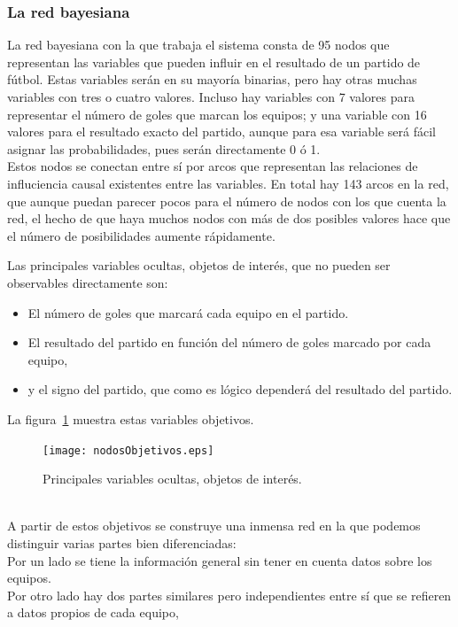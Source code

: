 \documentclass[a4paper,12pt]{article}
\begin{document}
	\subsubsection{La red bayesiana}
\par
La red bayesiana con la que trabaja el sistema consta de 95 nodos que representan las variables que pueden influir en el resultado de un partido de fútbol.
Estas variables serán en su mayoría binarias, pero hay otras muchas variables con tres o cuatro valores.
Incluso hay variables con 7 valores para representar el número de goles que marcan los equipos; y una variable con 16 valores para el resultado exacto del partido,
aunque para esa variable será fácil asignar las probabilidades, pues serán directamente 0 ó 1.
\\Estos nodos se conectan entre sí por arcos que representan las relaciones de influciencia causal existentes entre las variables.
En total hay 143 arcos en la red, que aunque puedan parecer pocos para el número de nodos con los que cuenta la red,
el hecho de que haya muchos nodos con más de dos posibles valores hace que el número de posibilidades aumente rápidamente.
\par
Las principales variables ocultas, objetos de interés, que no pueden ser observables directamente son:
\begin{itemize}
 \item El número de goles que marcará cada equipo en el partido.
 \item El resultado del partido en función del número de goles marcado por cada equipo,
 \item y el signo del partido, que como es lógico dependerá del resultado del partido.
\end{itemize}
La figura~\ref{fig:nodosObjetivos} muestra estas variables objetivos.
\begin{figure}[h]
 \begin{center}
  \texttt{[image: nodosObjetivos.eps]}
\caption{Principales variables ocultas, objetos de interés.}
\label{fig:nodosObjetivos}
 \end{center}
\end{figure} 
\\
A partir de estos objetivos se construye una inmensa red en la que podemos distinguir varias partes bien diferenciadas:
\\Por un lado se tiene la información general sin tener en cuenta datos sobre los equipos.
\\Por otro lado hay dos partes similares pero independientes entre sí que se refieren a datos propios de cada equipo,
\end{document}
